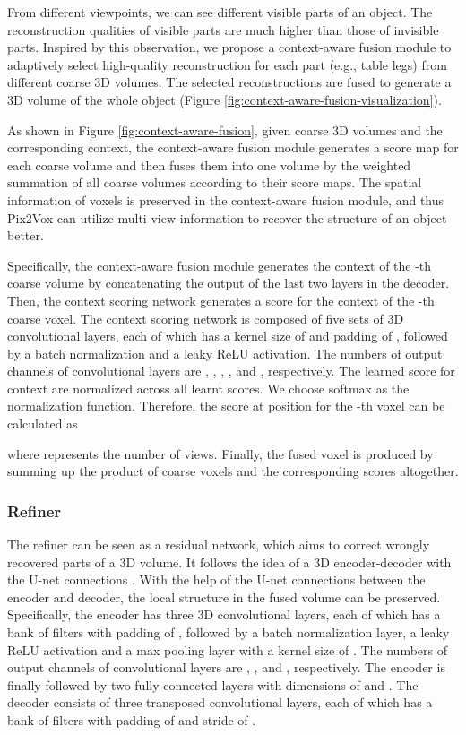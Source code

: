 \documentclass[10pt,twocolumn,letterpaper]{article}
\begin{document}
From different viewpoints, we can see different visible parts of an object.
The reconstruction qualities of visible parts are much higher than those of invisible parts.
Inspired by this observation, we propose a context-aware fusion module to adaptively select high-quality reconstruction for each part (e.g., table legs) from different coarse 3D volumes.
The selected reconstructions are fused to generate a 3D volume of the whole object (Figure \ref{fig:context-aware-fusion-visualization}).

As shown in Figure \ref{fig:context-aware-fusion}, given coarse 3D volumes and the corresponding context, the context-aware fusion module generates a score map for each coarse volume and then fuses them into one volume by the weighted summation of all coarse volumes according to their score maps.
The spatial information of voxels is preserved in the context-aware fusion module, and thus Pix2Vox can utilize multi-view information to recover the structure of an object better.

Specifically, the context-aware fusion module generates the context  of the -th coarse volume  by concatenating the output of the last two layers in the decoder.
Then, the context scoring network generates a score  for the context of the -th coarse voxel.
The context scoring network is composed of five sets of 3D convolutional layers, each of which has a kernel size of  and padding of , followed by a batch normalization and a leaky ReLU activation.
The numbers of output channels of convolutional layers are , , , , and , respectively.
The learned score  for context  are normalized across all learnt scores.
We choose softmax as the normalization function. 
Therefore, the score  at position  for the -th voxel can be calculated as 


where  represents the number of views.
Finally, the fused voxel  is produced by summing up the product of coarse voxels and the corresponding scores altogether.



\vspace{-3 mm}
\subsubsection{Refiner}
\vspace{-1 mm}

The refiner can be seen as a residual network, which aims to correct wrongly recovered parts of a 3D volume.
It follows the idea of a 3D encoder-decoder with the U-net connections \cite{DBLP:conf/miccai/RonnebergerFB15}. 
With the help of the U-net connections between the encoder and decoder, the local structure in the fused volume can be preserved.
Specifically, the encoder has three 3D convolutional layers, each of which has a bank of  filters with padding of , followed by a batch normalization layer, a leaky ReLU activation and a max pooling layer with a kernel size of .
The numbers of output channels of convolutional layers are , , and , respectively.
The encoder is finally followed by two fully connected layers with dimensions of  and .
The decoder consists of three transposed convolutional layers, each of which has a bank of  filters with padding of  and stride of .
\end{document}
